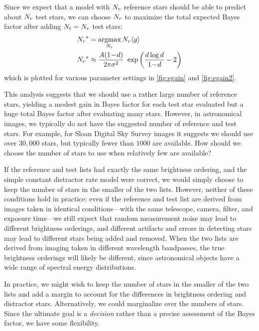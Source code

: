 Since we expect that a model with ${N_r}$ reference stars should be
able to predict about ${N_r}$ test stars, we can choose ${N_r}$ to
maximize the total expected Bayes factor after adding ${N_t}={N_r}$
test stars:
\begin{align}
  {N_r}^{\ast} &= \operatorname*{argmax}\limits_{{N_r}} {N_r} \langle g \rangle \\
  {N_r}^{\ast}
  &\approx \frac{A (1\!-\!d)}{2 \pi \sigma^2} \ \exp{\left( \frac{d \log d}{1\!-\!d} - 2 \right)}
  \label{eq:totalgain}
\end{align}
which is plotted for various parameter settings in \Figs
\ref{fig:egain} and \ref{fig:egain2}.


This analysis suggests that we should use a rather large number of
reference stars, yielding a modest gain in Bayes factor for each test
star evaluated but a huge total Bayes factor after evaluating many
stars.  However, in astronomical images, we typically do not have the
suggested number of reference and test stars.  For example, for Sloan
Digital Sky Survey images it suggests we should use over $30,000$
stars, but typically fewer than $1000$ are available.  How should we
choose the number of stars to use when relatively few are available?


If the reference and test lists had exactly the same brightness
ordering, and the simple constant distractor rate model were correct,
we would simply choose to keep the number of stars in the smaller of
the two lists.  However, neither of these conditions hold in practice:
even if the reference and test list are derived from images taken in
identical conditions---with the same telescope, camera, filter, and
exposure time---we still expect that random measurement noise may lead
to different brightness orderings, and different artifacts and errors
in detecting stars may lead to different stars being added and
removed.  When the two lists are derived from imaging taken in
different wavelength bandpasses, the true brightness orderings will
likely be different, since astronomical objects have a wide range of
spectral energy distributions.


In practice, we might wish to keep the number of stars in the smaller
of the two lists and add a margin to account for the differences in
brightness ordering and distractor stars.  Alternatively, we could
marginalize over the numbers of stars.  Since the ultimate goal is a
\emph{decision} rather than a precise assessment of the Bayes factor,
we have some flexibility.

